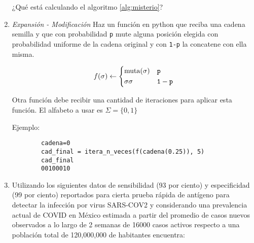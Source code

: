 \documentclass[letter]{article}
\begin{document}
\begin{enumerate}
        
        	¿Qué está calculando el algoritmo \ref{alg:misterio}?

        \item {\it Expansión - Modificación} Haz un función en python que reciba una cadena semilla y que con
        probabilidad {\tt p} mute alguna posición elegida con probabilidad uniforme de la cadena original 
        y con {\tt 1-p} la concatene con ella misma. 

        \[ f(\sigma) \leftarrow  \begin{dcases}            
                \operatorname{muta} (\sigma)   &  {\tt p} \\
                \sigma \sigma  &  {\tt 1-p}
        \end{dcases}
        \]

        Otra función debe recibir una cantidad de iteraciones para aplicar esta función.
        El alfabeto a usar es $\Sigma = \lbrace 0,1 \rbrace$

        Ejemplo:

        \begin{lstlisting}
        cadena=0
        cad_final = itera_n_veces(f(cadena(0.25)), 5)
        cad_final
        00100010
        \end{lstlisting}
    
        \item  Utilizando los siguientes datos de sensibilidad (93 por ciento)
        	y especificidad (99 por ciento) reportados para cierta prueba rápida 
        	de antígeno para detectar la infección por virus SARS-COV2 y considerando
        	una prevalencia actual de COVID en México estimada a partir del promedio 
        	de casos nuevos observados a lo largo de 2 semanas de 16000 casos activos
        	respecto a una población total de 120,000,000 de habitantes encuentra:
        	

\end{enumerate}
\end{document}
